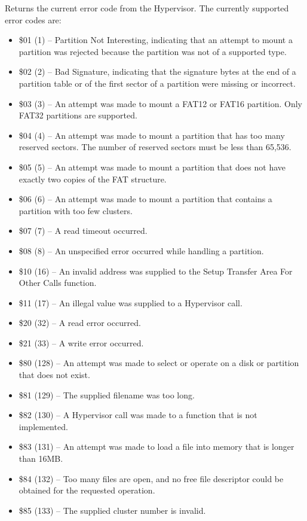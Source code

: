 Returns the current error code from the Hypervisor.  The currently supported
error codes are:

\begin{itemize}
\item \$01 (1) -- Partition Not Interesting, indicating that an attempt to mount a partition was rejected because the partition was not of a supported type.
\item \$02 (2) -- Bad Signature, indicating that the signature bytes at the end of a partition table or of the first sector of a partition were missing or incorrect.
\item \$03 (3) -- An attempt was made to mount a FAT12 or FAT16 partition.  Only FAT32 partitions are supported.
\item \$04 (4) -- An attempt was made to mount a partition that has too many reserved sectors. The number of reserved sectors must be less than 65,536.
  \item \$05 (5) -- An attempt was made to mount a partition that does not have exactly two copies of the FAT structure.
\item \$06 (6) -- An attempt was made to mount a partition that contains a partition with too few clusters.
\item \$07 (7) -- A read timeout occurred.
  \item \$08 (8) -- An unspecified error occurred while handling a partition.
\item \$10 (16) -- An invalid address was supplied to the Setup Transfer Area For Other Calls function.
\item \$11 (17) -- An illegal value was supplied to a Hypervisor call.
\item \$20 (32) -- A read error occurred.
\item \$21 (33) -- A write error occurred.
\item \$80 (128) -- An attempt was made to select or operate on a disk or partition that does not exist.
\item \$81 (129) -- The supplied filename was too long.
\item \$82 (130) -- A Hypervisor call was made to a function that is not implemented. 
\item \$83 (131) -- An attempt was made to load a file into memory that is longer than 16MB.
\item \$84 (132) -- Too many files are open, and no free file descriptor could be obtained for the requested operation.
\item \$85 (133) -- The supplied cluster number is invalid.

\end{itemize}
